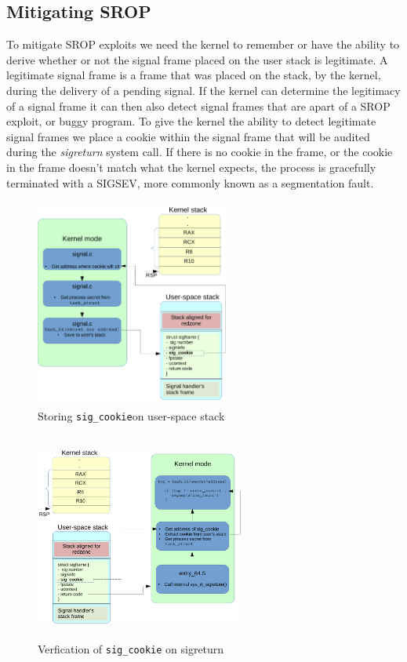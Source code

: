 \documentclass{sig-alternate-05-2015}
\begin{document}
\subsection{Mitigating SROP}
To mitigate SROP exploits we need the kernel to remember or have the ability to derive whether or not the signal frame placed on the user stack is legitimate. A legitimate signal frame is a frame that was placed on the stack, by the kernel, during the delivery of a pending signal. If the kernel can determine the legitimacy of a signal frame it can then also detect signal frames that are apart of a SROP exploit, or buggy program. To give the kernel the ability to detect legitimate signal frames we place a cookie within the signal frame that will be audited during the \textit{sigreturn} system call. If there is no cookie in the frame, or the cookie in the frame doesn't match what the kernel expects, the process is gracefully terminated with a SIGSEV, more commonly known as a segmentation fault. 

\begin{figure}
\centering
\includegraphics[height=2.7in, width=2.5in]{6.pdf}
\caption{Storing \texttt{sig\_cookie}on user-space stack}
\label{fig:sig6}
\end{figure}

\begin{figure}
\centering
\includegraphics[height=2.7in, width=2.7in]{7.pdf}
\caption{Verfication of \texttt{sig\_cookie} on sigreturn}
\label{fig:sig7}
\end{figure}
\end{document}
